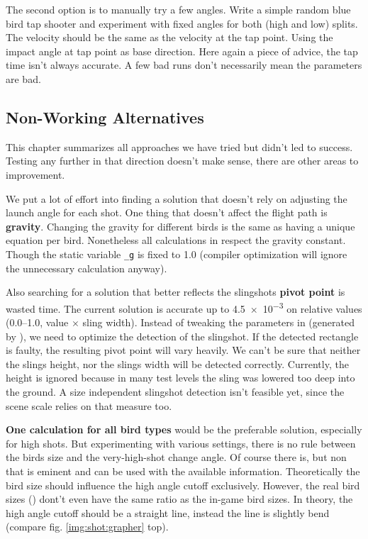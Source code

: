The second option is to manually try a few angles. Write a simple random blue bird tap shooter and experiment with fixed angles for both (high and low) splits. The velocity should be the same as the velocity at the tap point. Using the impact angle at tap point as base direction. Here again a piece of advice, the tap time isn't always accurate. A few bad runs don't necessarily mean the parameters are bad.




\subsection{Non-Working Alternatives}\label{ch:shot:fails}

This chapter summarizes all approaches we have tried but didn't led to success. Testing any further in that direction doesn't make sense, there are other areas to improvement.

We put a lot of effort into finding a solution that doesn't rely on adjusting the launch angle for each shot. One thing that doesn't affect the flight path is \textbf{gravity}. Changing the gravity for different birds is the same as having a unique equation per bird. Nonetheless all calculations in  respect the gravity constant. Though the static variable \texttt{\_g} is fixed to \num{1.0} (compiler optimization will ignore the unnecessary calculation anyway).

Also searching for a solution that better reflects the slingshots \textbf{pivot point} is wasted time. The current solution is accurate up to \num{4.5e-3} on relative values (\numrange{0.0}{1.0}, value $\times$ sling width). Instead of tweaking the parameters in  (generated by ), we need to optimize the detection of the slingshot. If the detected rectangle is faulty, the resulting pivot point will vary heavily. We can't be sure that neither the slings height, nor the slings width will be detected correctly. Currently, the height is ignored because in many test levels the sling was lowered too deep into the ground. A size independent slingshot detection isn't feasible yet, since the scene scale relies on that measure too.


\textbf{One calculation for all bird types} would be the preferable solution, especially for high shots. But experimenting with various settings, there is no rule between the birds size and the very-high-shot change angle. Of course there is, but non that is eminent and can be used with the available information. Theoretically the bird size should influence the high angle cutoff exclusively. However, the real bird sizes () dont't even have the same ratio as the in-game bird sizes. In theory, the high angle cutoff should be a straight line, instead the line is slightly bend (compare fig. \ref{img:shot:grapher} top).

